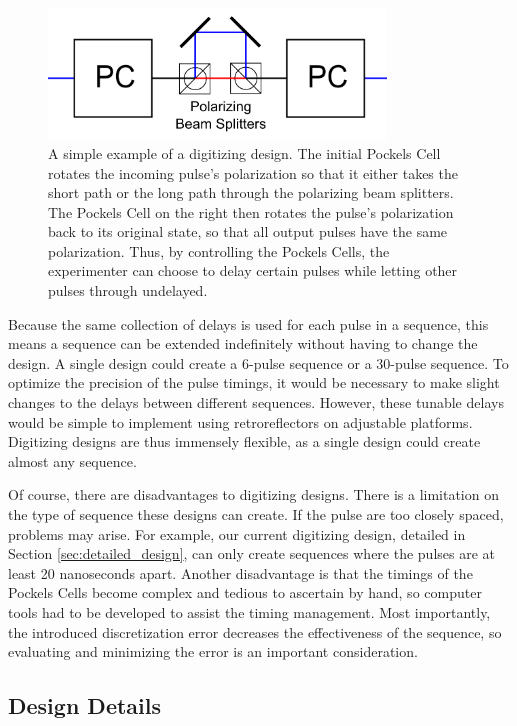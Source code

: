 \documentclass[pdftex,12pt,a4paper]{article}
\begin{document}
 \begin{figure}[t]
\centering
\includegraphics[width=0.8\textwidth]{simple_digitizing.png}
\caption{A simple example of a digitizing design. The initial Pockels Cell rotates the incoming pulse's polarization so that it either takes the short path or the long path through the polarizing beam splitters. The Pockels Cell on the right then rotates the pulse's polarization back to its original state, so that all output pulses have the same polarization. Thus, by controlling the Pockels Cells, the experimenter can choose to delay certain pulses while letting other pulses through undelayed.}
\label{fig:simple}
\end{figure}
    
Because the same collection of delays is used for each pulse in a sequence, this means a sequence can be extended indefinitely without having to change the design. A single design could create a 6-pulse sequence or a 30-pulse sequence. To optimize the precision of the pulse timings, it would be necessary to make slight changes to the delays between different sequences. However, these tunable delays would be simple to implement using retroreflectors on adjustable platforms. Digitizing designs are thus immensely flexible, as a single design could create almost any sequence. 
    
Of course, there are disadvantages to digitizing designs. There is a limitation on the type of sequence these designs can create. If the pulse are too closely spaced, problems may arise. For example, our current digitizing design, detailed in Section \ref{sec:detailed_design}, can only create sequences where the pulses are at least 20 nanoseconds apart. Another disadvantage is that the timings of the Pockels Cells become complex and tedious to ascertain by hand, so computer tools had to be developed to assist the timing management. Most importantly, the introduced discretization error decreases the effectiveness of the sequence, so evaluating and minimizing the error is an important consideration.

\subsection{Design Details}
\end{document}
